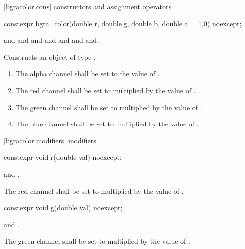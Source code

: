  [bgracolor.cons] { constructors and assignment operators}

\begin{itemdecl}
constexpr bgra_color(double r, double g, double b, double a = 1.0) noexcept;
\end{itemdecl}
\begin{itemdescr}
\pnum
\requires
{} and  and  and  and  and  and  and .

\pnum
\effects
Constructs an object of type .

\begin{enumerate}
\item The alpha channel shall be set to the value of .
\item The red channel shall be set to  multiplied by the value of  .
\item The green channel shall be set to  multiplied by the value of .
\item The blue channel shall be set to  multiplied by the value of .
\end{enumerate}
\end{itemdescr}


 [bgracolor.modifiers]{ modifiers}

\begin{itemdecl}
constexpr void r(double val) noexcept;
\end{itemdecl}

\begin{itemdescr}
\pnum
\requires
{} and .

\pnum
\effects
The red channel shall be set to  multiplied by the value of  .
\end{itemdescr}

\begin{itemdecl}
constexpr void g(double val) noexcept;
\end{itemdecl}
\begin{itemdescr}
\pnum
\requires
{} and .

\pnum
\effects
The green channel shall be set to  multiplied by the value of  .
\end{itemdescr}

